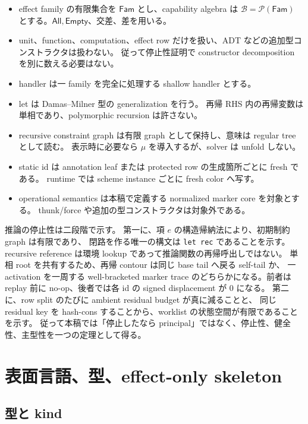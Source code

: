 \documentclass[uplatex,dvipdfmx,a4paper,10.5pt]{jsarticle}
\theoremstyle{jpplain}
\newcommand{\Fam}{\mathsf{Fam}}
\newcommand{\All}{\mathsf{All}}
\newcommand{\Empty}{\mathsf{Empty}}
\newcommand{\Caps}{\mathcal B}
\begin{document}
\begin{itemize}
  \item effect family の有限集合を $\Fam$ とし、capability algebra は
        $\Caps=\mathcal P(\Fam)$ とする。$\All,\Empty$、交差、差を用いる。
  \item unit、function、computation、effect row だけを扱い、ADT などの追加型コンストラクタは扱わない。
        従って停止性証明で constructor decomposition を別に数える必要はない。
  \item handler は一 family を完全に処理する shallow handler とする。
  \item let は Damas--Milner 型の generalization を行う。
        再帰 RHS 内の再帰変数は単相であり、polymorphic recursion は許さない。
  \item recursive constraint graph は有限 graph として保持し、意味は regular tree として読む。
        表示時に必要なら $\mu$ を導入するが、solver は unfold しない。
  \item static id は annotation leaf または protected row の生成箇所ごとに fresh である。
        runtime では scheme instance ごとに fresh color へ写す。
  \item operational semantics は本稿で定義する normalized marker core を対象とする。
        thunk/force や追加の型コンストラクタは対象外である。
\end{itemize}

\begin{statusbox}[title={証明の構成}]
推論の停止性は二段階で示す。
第一に、項 $e$ の構造帰納法により、初期制約 graph は有限であり、
閉路を作る唯一の構文は \texttt{let rec} であることを示す。
recursive reference は環境 lookup であって推論関数の再帰呼出しではない。
単相 root を共有するため、再帰 contour は同じ base tail へ戻る self-tail か、
一 activation を一周する well-bracketed marker trace のどちらかになる。前者は replay 前に no-op、後者では各 id の signed displacement が 0 になる。
第二に、row split のたびに ambient residual budget が真に減ることと、
同じ residual key を hash-cons することから、worklist の状態空間が有限であることを示す。
従って本稿では「停止したなら principal」ではなく、停止性、健全性、主型性を一つの定理として得る。
\end{statusbox}

\section{表面言語、型、effect-only skeleton}

\subsection{型と kind}
\end{document}
